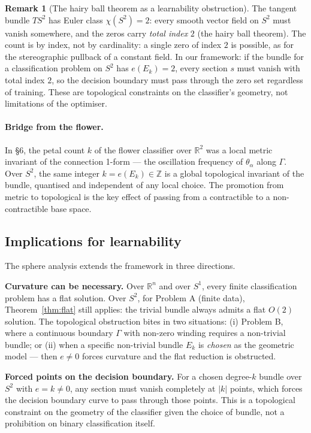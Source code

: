 \documentclass[11pt, a4paper]{article}
\theoremstyle{plain}
\theoremstyle{definition}
\newtheorem{remark}[theorem]{Remark}
\newcommand{\R}{\mathbb{R}}
\newcommand{\Gam}{\Gamma}
\begin{document}
\begin{remark}[The hairy ball theorem as a learnability obstruction]
The tangent bundle $TS^2$ has Euler class $\chi(S^2) = 2$: every smooth vector
field on $S^2$ must vanish somewhere, and the zeros carry \emph{total index} $2$
(the hairy ball theorem). The count is by index, not by cardinality: a single
zero of index $2$ is possible, as for the stereographic pullback of a constant
field. In our framework: if the bundle for a classification problem on $S^2$ has
$e(E_k) = 2$, every section $s$ must vanish with total index $2$, so the decision
boundary must pass through the zero set regardless of training. These are
topological constraints on the classifier's geometry, not limitations of the
optimiser.
\end{remark}

\paragraph{Bridge from the flower.}
In \S6, the petal count $k$ of the flower classifier over $\R^2$ was a local
metric invariant of the connection 1-form --- the oscillation frequency of
$\theta_\alpha$ along $\Gam$. Over $S^2$, the same integer $k = e(E_k) \in \mathbb{Z}$
is a global topological invariant of the bundle, quantised and independent of
any local choice. The promotion from metric to topological is the key effect of
passing from a contractible to a non-contractible base space.

\subsection{Implications for learnability}

The sphere analysis extends the framework in three directions.

\textbf{Curvature can be necessary.} Over $\R^n$ and over $S^1$,
every finite classification problem has a flat solution. Over $S^2$, for Problem A
(finite data), Theorem~\ref{thm:flat} still applies: the trivial bundle always
admits a flat $O(2)$ solution. The topological obstruction bites in two situations:
(i) Problem B, where a continuous boundary $\Gam$ with non-zero winding requires a
non-trivial bundle; or (ii) when a specific non-trivial bundle $E_k$ is
\emph{chosen} as the geometric model — then $e \neq 0$ forces curvature and the
flat reduction is obstructed.

\textbf{Forced points on the decision boundary.} For a chosen degree-$k$ bundle
over $S^2$ with $e = k \neq 0$, any section must vanish completely at $|k|$
points, which forces the decision boundary curve to pass through those points.
This is a topological constraint on the geometry of the classifier given the
choice of bundle, not a prohibition on binary classification itself.
\end{document}
